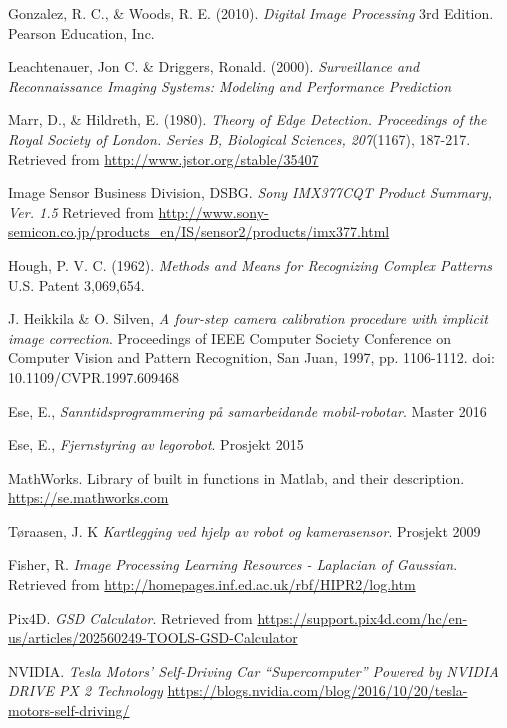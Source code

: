 \begin{thebibliography}{99}
    Gonzalez, R. C., \& Woods, R. E. (2010). \emph{Digital Image Processing} 3rd Edition. Pearson Education, Inc.
    
	Leachtenauer, Jon C.  \& Driggers, Ronald. (2000). \emph{Surveillance and Reconnaissance Imaging Systems: Modeling and Performance Prediction}
    
	Marr, D., \& Hildreth, E. (1980). \emph{Theory of Edge Detection. Proceedings of the Royal Society of London. Series B, Biological Sciences, 207}(1167), 187-217. Retrieved from \url{http://www.jstor.org/stable/35407}

	Image Sensor Business Division, DSBG. \emph{Sony IMX377CQT Product Summary, Ver. 1.5} Retrieved from \url{http://www.sony-semicon.co.jp/products_en/IS/sensor2/products/imx377.html}
    
	Hough, P. V. C. (1962). \emph{Methods and Means for Recognizing Complex Patterns} U.S. Patent 3,069,654.
    
	J. Heikkila \& O. Silven, \emph{A four-step camera calibration procedure with implicit image correction}. Proceedings of IEEE Computer Society Conference on Computer Vision and Pattern Recognition, San Juan, 1997, pp. 1106-1112.
doi: 10.1109/CVPR.1997.609468

	Ese, E., \emph{Sanntidsprogrammering på samarbeidande mobil-robotar}. Master 2016
    
	Ese, E., \emph{Fjernstyring av legorobot}. Prosjekt 2015
    
	MathWorks. Library of built in functions in Matlab, and their description. \url{https://se.mathworks.com}
    
	Tøraasen, J. K \emph{Kartlegging ved hjelp av robot og kamerasensor}. Prosjekt 2009
    
	Fisher, R. \emph{Image Processing Learning Resources - Laplacian of Gaussian}. Retrieved from \url{http://homepages.inf.ed.ac.uk/rbf/HIPR2/log.htm}

	Pix4D. \emph{GSD Calculator}. Retrieved from \url{https://support.pix4d.com/hc/en-us/articles/202560249-TOOLS-GSD-Calculator}
    
	NVIDIA. \emph{Tesla Motors’ Self-Driving Car “Supercomputer” Powered by NVIDIA DRIVE PX 2 Technology} \url{https://blogs.nvidia.com/blog/2016/10/20/tesla-motors-self-driving/}
    

\end{thebibliography}
